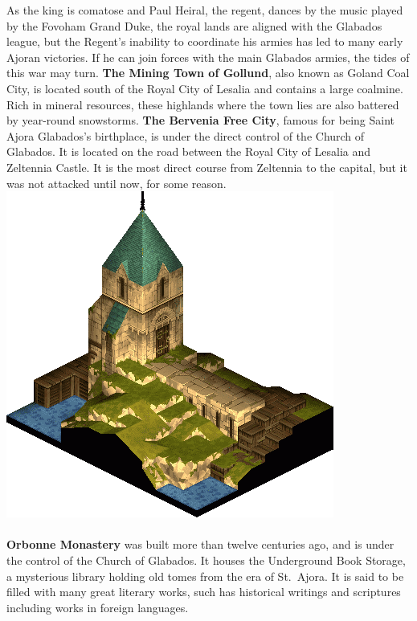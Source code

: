 As the king is comatose and Paul Heiral, the regent, dances by the music played by the Fovoham Grand Duke, the royal lands are aligned with the Glabados league, but the Regent's inability to coordinate his armies has led to many early Ajoran victories. 
If he can join forces with the main Glabados armies, the tides of this war may turn.
\textbf{The Mining Town of Gollund}, also known as Goland Coal City, is located south of the Royal City of Lesalia and contains a large coalmine. 
Rich in mineral resources, these highlands where the town lies are also battered by year-round snowstorms.
\textbf{The Bervenia Free City}, famous for being Saint Ajora Glabados's birthplace, is under the direct control of the Church of Glabados.
It is located on the road between the Royal City of Lesalia and Zeltennia Castle. 
It is the most direct course from Zeltennia to the capital, but it was not attacked until now, for some reason.
%
\includegraphics[width=\columnwidth]{./art/images/orbonne.png}
\\\\
%
\textbf{Orbonne Monastery} was built more than twelve centuries ago, and is under the control of the Church of Glabados. 
It houses the Underground Book Storage, a mysterious library holding old tomes from the era of St.~Ajora. 
It is said to be filled with many great literary works, such has historical writings and scriptures including works in foreign languages. 
